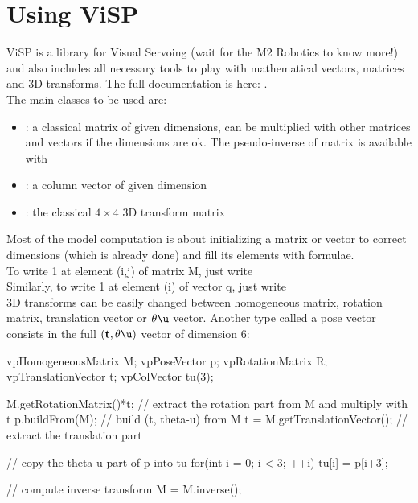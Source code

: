 \documentclass{ecnreport}
\begin{document}
  
  
  \appendix
  
  
  \newpage
  
  \section{Using ViSP}\label{visp}
  
  ViSP is a library for Visual Servoing (wait for the M2 Robotics to know more!) and also includes all necessary tools to play with mathematical vectors, matrices and 3D transforms.
  The full documentation is here: .\\
  The main classes to be used are:
  \begin{itemize}
    \item {}: a classical matrix of given dimensions, can be multiplied with other matrices and vectors if the dimensions are ok. The pseudo-inverse of matrix 
    is available with 
    \item {}: a column vector of given dimension
    \item {}: the classical $4\times 4$ 3D transform matrix
  \end{itemize}
  Most of the model computation is about initializing a matrix or vector to correct dimensions (which is already done) and fill its elements with formulae.\\
  To write 1 at element (i,j) of matrix M, just write \\
  Similarly, to write 1 at element (i) of vector q, just write \\
  
  3D transforms can be easily changed between homogeneous matrix, rotation matrix, translation vector or $\theta\u$ vector. Another type called a pose vector
  consists in the full $(\mathbf{t}, \theta\u)$ vector of dimension 6:
  \begin{cppcode}
  vpHomogeneousMatrix M;
  vpPoseVector p;
  vpRotationMatrix R;
  vpTranslationVector t;
  vpColVector tu(3);
  
  M.getRotationMatrix()*t;	// extract the rotation part from M and multiply with t
  p.buildFrom(M);			// build (t, theta-u) from M
  t = M.getTranslationVector();	// extract the translation part
  
  // copy the theta-u part of p into tu
  for(int i = 0; i < 3; ++i)
  tu[i] = p[i+3];
  
  // compute inverse transform
  M = M.inverse();
  \end{cppcode}
  
\end{document}
